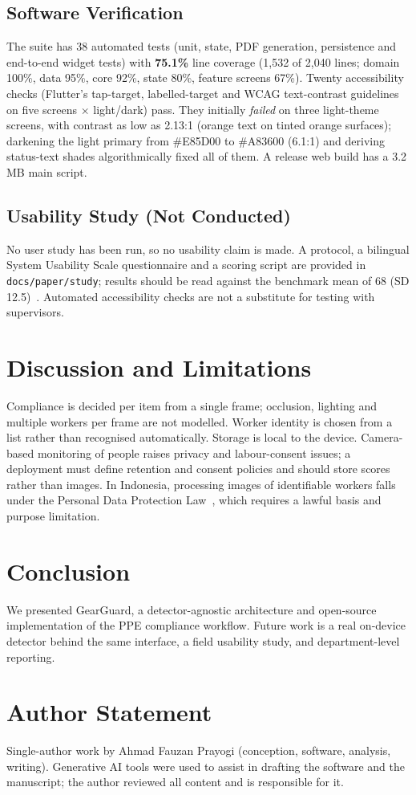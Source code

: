 \documentclass[conference]{IEEEtran}
\begin{document}
\subsection{Software Verification}
The suite has 38 automated tests (unit, state, PDF generation, persistence and
end-to-end widget tests) with \textbf{75.1\%} line coverage (1{,}532 of 2{,}040
lines; domain 100\%, data 95\%, core 92\%, state 80\%, feature screens 67\%).
Twenty accessibility checks (Flutter's tap-target, labelled-target and WCAG
text-contrast guidelines on five screens $\times$ light/dark) pass. They
initially \emph{failed} on three light-theme screens, with contrast as low as
2.13:1 (orange text on tinted orange surfaces); darkening the light primary from
\#E85D00 to \#A83600 (6.1:1) and deriving status-text shades algorithmically fixed
all of them. A release web build has a 3.2\,MB main script.

\subsection{Usability Study (Not Conducted)}
No user study has been run, so no usability claim is made. A protocol, a bilingual
System Usability Scale questionnaire and a scoring script are provided in
\texttt{docs/paper/study}; results should be read against the benchmark mean of
68 (SD 12.5)~\cite{hyzy2022sus}. Automated accessibility checks are not a
substitute for testing with supervisors.

\section{Discussion and Limitations}
Compliance is decided per item from a single frame; occlusion, lighting and
multiple workers per frame are not modelled. Worker identity is chosen from a
list rather than recognised automatically. Storage is local to the device.
Camera-based monitoring of people raises privacy and labour-consent issues; a
deployment must define retention and consent policies and should store scores
rather than images. In Indonesia, processing images of identifiable workers falls under the Personal Data Protection Law~\cite{uupdp2022}, which requires a lawful basis and purpose limitation.

\section{Conclusion}
We presented GearGuard, a detector-agnostic architecture and open-source
implementation of the PPE compliance workflow. Future work is a real on-device
detector behind the same interface, a field usability study, and
department-level reporting.

\section*{Author Statement}
Single-author work by Ahmad Fauzan Prayogi (conception, software, analysis,
writing). Generative AI tools were used to assist in drafting the software and
the manuscript; the author reviewed all content and is responsible for it.



\end{document}
